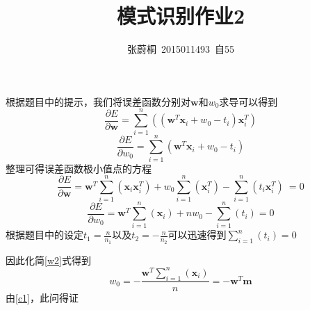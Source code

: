 \documentclass[UTF8,a4paper]{ctexart}
\title{模式识别作业2}
\author{张蔚桐\ 2015011493\ 自55}
\begin{document}
\maketitle
\section{}
\subsection{}
根据题目中的提示，我们将误差函数分别对$\mathbf{w}$和$w_0$求导可以得到
\begin{equation}\displaystyle{
\frac{\partial E}{\partial \mathbf{w}}=\sum_{i=1}^n((\mathbf{w}^T\mathbf{x}_i+w_0-t_i)\mathbf{x}_i^T) }
\end{equation}\begin{equation}
\displaystyle{
\frac{\partial E}{\partial w_0}=\sum_{i=1}^n(\mathbf{w}^T\mathbf{x}_i+w_0-t_i)}
\end{equation}
整理可得误差函数极小值点的方程
\begin{equation}
\displaystyle{
\frac{\partial E}{\partial \mathbf{w}}=
\mathbf{w}^T\sum_{i=1}^n(\mathbf{x}_i\mathbf{x}_i^T)+w_0\sum_{i=1}^n(\mathbf{x}_i^T)-\sum_{i=1}^n(t_i\mathbf{x}_i^T)\ =0}
\label{w} 
\end{equation}\begin{equation}
\displaystyle{
\frac{\partial E}{\partial w_0}=\mathbf{w}^T\sum_{i=1}^n(\mathbf{x}_i)+nw_0-\sum_{i=1}^n(t_i)=0}
\label{w2}
\end{equation}
根据题目中的设定$t_1=\frac{n}{n_1}$以及$t_2=-\frac{n}{n_2}$可以迅速得到$\sum_{i=1}^n(t_i)=0$

因此化简\ref{w2}式得到
\begin{equation}
\displaystyle{
w_0=-\frac{\mathbf{w}^T\sum_{i=1}^n(\mathbf{x}_i)}{n}=-\mathbf{w}^T\mathbf{m}}
\label{c1}
\end{equation}
由\ref{c1}，此问得证
\end{document}
